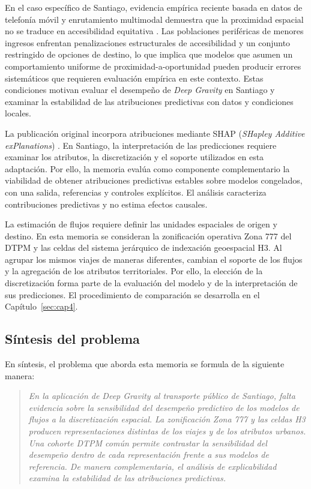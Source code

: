 En el caso específico de Santiago, evidencia empírica reciente basada en datos de telefonía móvil y enrutamiento multimodal demuestra que la proximidad espacial no se traduce en accesibilidad equitativa \cite{marinflores2026proximity}. Las poblaciones periféricas de menores ingresos enfrentan penalizaciones estructurales de accesibilidad y un conjunto restringido de opciones de destino, lo que implica que modelos que asumen un comportamiento uniforme de proximidad-a-oportunidad pueden producir errores sistemáticos que requieren evaluación empírica en este contexto. Estas condiciones motivan evaluar el desempeño de \textit{Deep Gravity} en Santiago y examinar la estabilidad de las atribuciones predictivas con datos y condiciones locales.

La publicación original incorpora atribuciones mediante SHAP (\textit{SHapley Additive exPlanations}) \cite{simini2021deep}. En Santiago, la interpretación de las predicciones requiere examinar los atributos, la discretización y el soporte utilizados en esta adaptación. Por ello, la memoria evalúa como componente complementario la viabilidad de obtener atribuciones predictivas estables sobre modelos congelados, con una salida, referencias y controles explícitos. El análisis caracteriza contribuciones predictivas y no estima efectos causales.

La estimación de flujos requiere definir las unidades espaciales de origen y destino. En esta memoria se consideran la zonificación operativa Zona 777 del DTPM y las celdas del sistema jerárquico de indexación geoespacial H3. Al agrupar los mismos viajes de maneras diferentes, cambian el soporte de los flujos y la agregación de los atributos territoriales. Por ello, la elección de la discretización forma parte de la evaluación del modelo y de la interpretación de sus predicciones. El procedimiento de comparación se desarrolla en el Capítulo~\ref{sec:cap4}.

\subsection{Síntesis del problema}

En síntesis, el problema que aborda esta memoria se formula de la siguiente manera:

\begin{quote}
\textit{En la aplicación de Deep Gravity al transporte público de Santiago, falta evidencia sobre la sensibilidad del desempeño predictivo de los modelos de flujos a la discretización espacial. La zonificación Zona 777 y las celdas H3 producen representaciones distintas de los viajes y de los atributos urbanos. Una cohorte DTPM común permite contrastar la sensibilidad del desempeño dentro de cada representación frente a sus modelos de referencia. De manera complementaria, el análisis de explicabilidad examina la estabilidad de las atribuciones predictivas.}
\end{quote}

